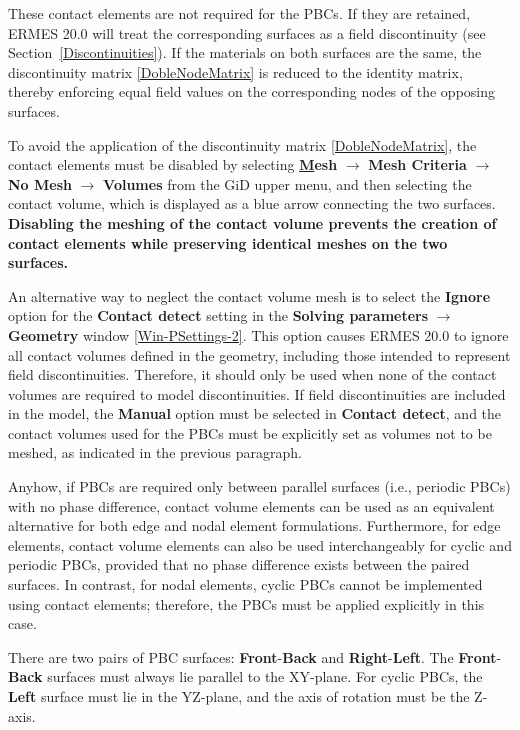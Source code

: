 \begin{itemize}
    These contact elements are not required for the PBCs. If they are retained, ERMES 20.0 will treat the corresponding surfaces as a field discontinuity (see Section~\ref{Discontinuities}). If the materials on both surfaces are the same, the discontinuity matrix \eqref{DobleNodeMatrix} is reduced to the identity matrix, thereby enforcing equal field values on the corresponding nodes of the opposing surfaces.
    
    To avoid the application of the discontinuity matrix \eqref{DobleNodeMatrix}, the contact elements must be disabled by selecting \textbf{\underline{M}esh} $\rightarrow$ \textbf{Mesh Criteria} $\rightarrow$ \textbf{No Mesh} $\rightarrow$ \textbf{Volumes} from the GiD upper menu, and then selecting the contact volume, which is displayed as a blue arrow connecting the two surfaces. \textbf{Disabling the meshing of the contact volume prevents the creation of contact elements while preserving identical meshes on the two surfaces.}
    
    An alternative way to neglect the contact volume mesh is to select the \textbf{Ignore} option for the \textbf{Contact detect} setting in the \textbf{Solving parameters} $\rightarrow$ \textbf{Geometry} window \ref{Win-PSettings-2}. This option causes ERMES 20.0 to ignore all contact volumes defined in the geometry, including those intended to represent field discontinuities. Therefore, it should only be used when none of the contact volumes are required to model discontinuities. If field discontinuities are included in the model, the \textbf{Manual} option must be selected in \textbf{Contact detect}, and the contact volumes used for the PBCs must be explicitly set as volumes not to be meshed, as indicated in the previous paragraph.
    
    Anyhow, if PBCs are required only between parallel surfaces (i.e., periodic PBCs) with no phase difference, contact volume elements can be used as an equivalent alternative for both edge and nodal element formulations. Furthermore, for edge elements, contact volume elements can also be used interchangeably for cyclic and periodic PBCs, provided that no phase difference exists between the paired surfaces. In contrast, for nodal elements, cyclic PBCs cannot be implemented using contact elements; therefore, the PBCs must be applied explicitly in this case.
    
    There are two pairs of PBC surfaces: \textbf{Front}-\textbf{Back} and \textbf{Right}-\textbf{Left}. The \textbf{Front}-\textbf{Back} surfaces must always lie parallel to the XY-plane. For cyclic PBCs, the \textbf{Left} surface must lie in the YZ-plane, and the axis of rotation must be the Z-axis.
    

\end{itemize}
